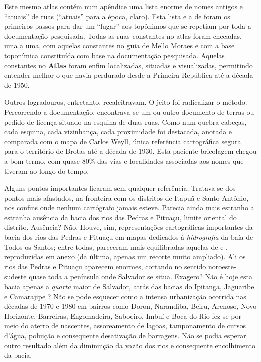 Este mesmo atlas contém num apêndice uma lista enorme de nomes antigos e ``atuais'' de ruas (``atuais'' para a época, claro). Esta lista e a de  foram os primeiros passos para dar um ``lugar'' aos topônimos que se repetiam por toda a documentação pesquisada. Todas as ruas constantes no atlas foram checadas, uma a uma, com aquelas constantes no guia de Mello Moraes e com a base toponímica constituída com base na documentação pesquisada. Aquelas constantes no \textbf{Atlas} foram enfim localizadas, situadas e visualizadas, permitindo entender melhor o que havia perdurado desde a Primeira República até a década de 1950.

Outros logradouros, entretanto, recalcitravam. O jeito foi radicalizar o método. Percorrendo a documentação, encontrava-se um ou outro documento de terras ou pedido de licença situado na esquina de duas ruas. Como num quebra-cabeças, cada esquina, cada vizinhança, cada proximidade foi destacada, anotada e comparada com o mapa de Carlos Weyll, única referência cartográfica segura para o território de Brotas até a década de 1930. Esta paciente bricolagem chegou a bom termo, com quase 80\% das vias e localidades associadas aos nomes que tiveram ao longo do tempo.

Alguns pontos importantes ficaram sem qualquer referência. Tratava-se dos pontos mais afastados, na fronteira com os distritos de Itapuã e Santo Antônio, nos confins onde nenhum cartógrafo jamais esteve. Parecia ainda mais estranho a estranha ausência da bacia dos rios das Pedras e Pituaçu, limite oriental do distrito. Ausência? Não. Houve, sim, representações cartográficas importantes da bacia dos rios das Pedras e Pituaçu em mapas dedicados à \textit{hidrografia} da baía de Todos os Santos; entre todas, pareceram mais equilibradas aquelas de \cite{lealteixeira_carta_1830} e \cite{sampaio_reconcavo_1899}, reproduzidas em anexo (da última, apenas um recorte muito ampliado). Ali os rios das Pedras e Pituaçu aparecem enormes, cortando no sentido noroeste-sudeste quase toda a península onde Salvador se situa. Exagero? Não é hoje esta bacia apenas a \textit{quarta} maior de Salvador, atrás das bacias do Ipitanga, Jaguaribe e Camarajipe \cite{santos_aguas_2010}? Não se pode esquecer como a intensa urbanização ocorrida nas décadas de 1970 e 1980 em bairros como Doron, Narandiba, Beiru, Arenoso, Novo Horizonte, Barreiras, Engomadeira, Saboeiro, Imbuí e Boca do Rio fez-se por meio do aterro de nascentes, assoreamento de lagoas, tamponamento de cursos d'água, poluição e consequente desativação de barragens. Não se podia esperar outro resultado além da diminuição da vazão dos rios e consequente encolhimento da bacia.

